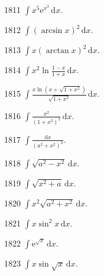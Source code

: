 
\begin{prob}[S]{1811}
$\int x^5 \mathrm{e}^{x^3}\,\mathrm{d}x$.
\end{prob}

\begin{prob}[S]{1812}
$\int (\arcsin x)^2\,\mathrm{d}x$.
\end{prob}

\begin{prob}[S]{1813}
$\int x(\arctan x)^2\,\mathrm{d}x$.
\end{prob}

\begin{prob}[S]{1814}
$\int x^2 \ln\frac{1 - x}{1 + x}\,\mathrm{d}x$.
\end{prob}

\begin{prob}[S]{1815}
$\int \frac{x\ln(x + \sqrt{1 + x^2})}{\sqrt{1 + x^2}}\,\mathrm{d}x$.
\end{prob}

\begin{prob}[S]{1816}
$\int \frac{x^2}{(1 + x^2)^2}\,\mathrm{d}x$.
\end{prob}

\begin{prob}[S]{1817}
$\int \frac{\mathrm{d}x}{(a^2 + x^2)^2}$.
\end{prob}

\begin{prob}[S]{1818}
$\int \sqrt{a^2 - x^2}\,\mathrm{d}x$.
\end{prob}

\begin{prob}[S]{1819}
$\int \sqrt{x^2 + a}\,\mathrm{d}x$.
\end{prob}

\begin{prob}[S]{1820}
$\int x^2 \sqrt{a^2 + x^2}\,\mathrm{d}x$.
\end{prob}

\begin{prob}[S]{1821}
$\int x\sin^2 x\,\mathrm{d}x$.
\end{prob}

\begin{prob}[S]{1822}
$\int \mathrm{e}^{\sqrt{x}}\,\mathrm{d}x$.
\end{prob}

\begin{prob}[S]{1823}
$\int x\sin\sqrt{x}\,\mathrm{d}x$.
\end{prob}

